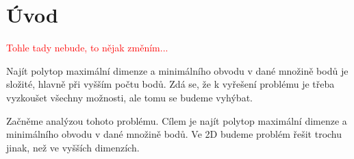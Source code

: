 \chapter*{Úvod}

\textcolor{red}{Tohle tady nebude, to nějak změním...}

Najít polytop maximální dimenze a minimálního obvodu v dané množině bodů je složité, hlavně při vyšším počtu bodů. Zdá se, že k vyřešení problému je třeba vyzkoušet všechny možnosti, ale tomu se budeme vyhýbat. 

Začněme analýzou tohoto problému. Cílem je najít polytop maximální dimenze a minimálního obvodu v dané množině bodů. Ve 2D budeme problém řešit trochu jinak, než ve vyšších dimenzích. 
